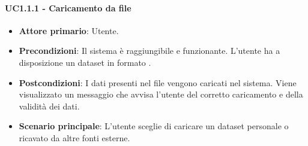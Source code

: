 \paragraph{UC1.1.1 - Caricamento da file}
\begin{itemize}
	\item \textbf{Attore primario}: Utente.
	\item \textbf{Precondizioni}: Il sistema è raggiungibile e funzionante. L'utente ha a disposizione un dataset in formato .
	\item \textbf{Postcondizioni}: I dati presenti nel file vengono caricati nel sistema. Viene visualizzato un messaggio che avvisa l'utente del corretto caricamento e della validità dei dati.
	\item \textbf{Scenario principale}: L'utente sceglie di caricare un dataset personale o ricavato da altre fonti esterne.
	
\end{itemize}